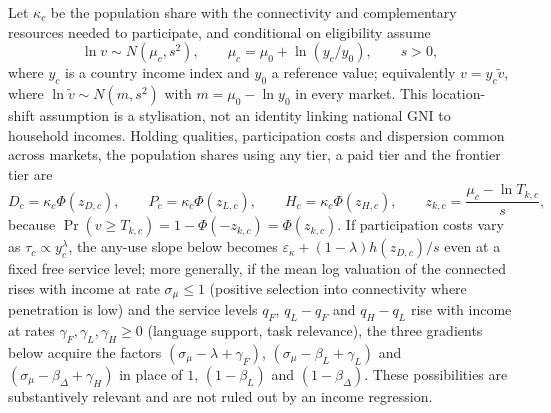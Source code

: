 \documentclass[11pt]{article}
\theoremstyle{definition}
\theoremstyle{remark}
\begin{document}
Let $\kappa_c$ be the population share with the connectivity and complementary resources needed to participate, and conditional on eligibility assume
\begin{equation}
 \ln v\sim N(\mu_c,s^2),\qquad \mu_c=\mu_0+\ln(y_c/y_0),\qquad s>0,
 \label{eq:conditional_distribution}
\end{equation}
where $y_c$ is a country income index and $y_0$ a reference value; equivalently $v=y_c\tilde v$, where $\ln\tilde v\sim N(m,s^2)$ with $m=\mu_0-\ln y_0$ in every market. This location-shift assumption is a stylisation, not an identity linking national GNI to household incomes. Holding qualities, participation costs and dispersion common across markets, the population shares using any tier, a paid tier and the frontier tier are
\begin{equation}
 D_c=\kappa_c\Phi(z_{D,c}),\qquad P_c=\kappa_c\Phi(z_{L,c}),\qquad H_c=\kappa_c\Phi(z_{H,c}),\qquad z_{k,c}=\frac{\mu_c-\ln T_{k,c}}{s},
 \label{eq:general_shares}
\end{equation}
because $\Pr(v\ge T_{k,c})=1-\Phi(-z_{k,c})=\Phi(z_{k,c})$. If participation costs vary as $\tau_c\propto y_c^\lambda$, the any-use slope below becomes $\varepsilon_\kappa+(1-\lambda)h(z_{D,c})/s$ even at a fixed free service level; more generally, if the mean log valuation of the connected rises with income at rate $\sigma_\mu\le1$ (positive selection into connectivity where penetration is low) and the service levels $q_F$, $q_L-q_F$ and $q_H-q_L$ rise with income at rates $\gamma_F,\gamma_L,\gamma_H\ge0$ (language support, task relevance), the three gradients below acquire the factors $(\sigma_\mu-\lambda+\gamma_F)$, $(\sigma_\mu-\beta_L+\gamma_L)$ and $(\sigma_\mu-\beta_\Delta+\gamma_H)$ in place of $1$, $(1-\beta_L)$ and $(1-\beta_\Delta)$. These possibilities are substantively relevant and are not ruled out by an income regression.
\end{document}
